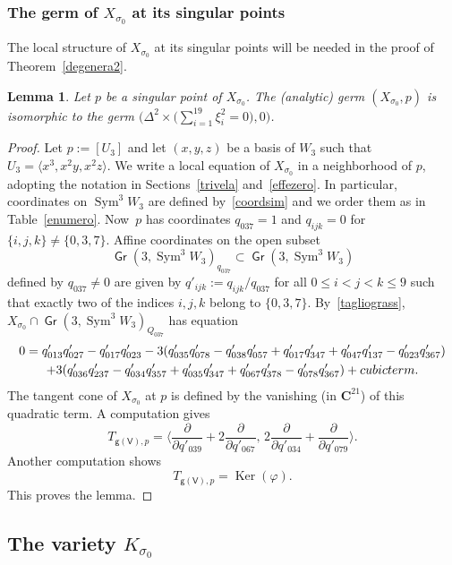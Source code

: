 \documentclass[11pt]{article}
\providecommand{\C}{}
\newtheorem{lemm}{Lemma}[section]
\theoremstyle{definition}
\renewcommand\C{{\mathbf C}}\let\CC\C
\newcommand\sfg{\mathsf{g}}
\newcommand\sfV{\mathsf{V}}
\newcommand\gv{\sfg(\sfV)}
\DeclareMathOperator{\Gr}{\mathsf{Gr}}
\let\phi\varphi
\let\aff\Delta
\let\la\langle
\let\ra\rangle
\DeclareMathOperator{\Ker}{Ker}
\DeclareMathOperator{\Sym}{Sym}
\begin{document}
\subsubsection{The germ of $X_{\sigma_0}$ at its singular points}

The local structure of $X_{\sigma_0}$ at its singular points will be needed in the proof of Theorem~\ref{degenera2}.

\begin{lemm}\label{normeffe}
Let $p$ be a singular point of $X_{\sigma_0}$. The (analytic) germ $(X_{\sigma_0},p)$ is isomorphic to the germ
$
\bigl(\aff^2\times \bigl(\sum_{i=1}^{19}\xi_i^2=0\bigr),0\bigr)$.
\end{lemm}

\begin{proof}
Let $p:=[U_3]$ and let $(x,y,z)$ be a basis of $W_3$ such that $U_3=\la x^3,x^2y,x^2z\ra$. We write a local equation of $X_{\sigma_0}$ in a neighborhood of
$p$, adopting the notation in Sections~\ref{trivela} and~\ref{effezero}. In particular, coordinates on $\Sym^3 \!W_3$ are defined by~\eqref{coordsim} and we order them as in Table~\ref{enumero}.
Now~$p$ has coordinates $q_{037}=1$ and $q_{ijk}=0$ for $\{i,j,k\}\ne \{0,3,7\}$.
Affine coordinates on the open subset
\[
 \Gr(3,\Sym^3\! W_3)_{q_{037}}\subset \Gr(3,\Sym^3\! W_3)
\]
defined by $q_{037}\ne 0$ are given by $q'_{ijk}:=q_{ijk}/q_{037}$ for all $0\le i<j<k\le 9$ such that exactly two of the indices $i,j,k$ belong to
$\{0,3,7\}$. By~\eqref{tagliograss}, $X_{\sigma_0}\cap \Gr(3,\Sym^3\! W_3)_{Q_{037}}$ has equation\vspace*{-5pt}
\begin{multline*}
0=q'_{013}q'_{027}-q'_{017}q'_{023}-3(q'_{035}q'_{078}-q'_{038}q'_{057}+q'_{017}q'_{347}+q'_{047}q'_{137}-q'_{023}q'_{367})\\
+3(q'_{036}q'_{237}-q'_{034}q'_{357}+q'_{035}q'_{347}
+q'_{067}q'_{378}-q'_{078}q'_{367})+\textnormal{cubic term.}
\end{multline*}
The tangent cone of $X_{\sigma_0}$ at $p$ is defined by the vanishing (in $\C^{21}$) of this quadratic term.
A computation gives
\[
T_{\gv,p}=\Big\la \frac{\partial}{\partial q'_{039}}+2\frac{\partial}{\partial q'_{067}},\, 2\frac{\partial}{\partial q'_{034}}+
\frac{\partial}{\partial q'_{079}}\Bigr\ra.
\]
Another computation shows
\[
T_{\gv,p}=\Ker(\phi).
\]
This proves the lemma.
\end{proof}

\subsection{The variety $K_{\sigma_0}$}\label{se73n}
\end{document}
